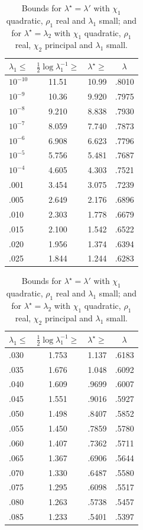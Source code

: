\documentclass[12pt,psamsfonts]{amsart}
\theoremstyle{definition}
\theoremstyle{remark}
\numberwithin{equation}{section}
\begin{document}
\begin{table}
\captionsetup{justification=centering}
\caption{
Bounds for $\lambda^{\star} = \lambda'$ with $\chi_1$ quadratic, $\rho_1$ real and $\lambda_1$ small; \newline and for $\lambda^{\star} = \lambda_2$ with $\chi_1$ quadratic, $\rho_1$ real,  $\chi_2$ principal and $\lambda_1$ small.
}

\begin{tabular}{l|c|c|c} 
$\lambda_1 \leq$ & $\tfrac{1}{2}\log \lambda_1^{-1} \geq$ & $\lambda^{\star} \geq$ & $\lambda$ \\
 \hline 
 $10^{-10}$ &  11.51 &  10.99 &  .8010 \\ 
 $10^{-9}$ &  10.36 &  9.920 &  .7975 \\ 
 $10^{-8}$ &  9.210 &  8.838 &  .7930 \\ 
 $10^{-7}$ &  8.059 &  7.740 &  .7873 \\ 
$10^{-6}$ &  6.908 &  6.623 &  .7796 \\ 
 $10^{-5}$ &  5.756 &  5.481 &  .7687 \\ 
 $10^{-4}$ &  4.605 &  4.303 &  .7521 \\ 
 .001 &  3.454 &  3.075 &  .7239 \\ 
 .005 &  2.649 &  2.176 &  .6896 \\ 
 .010 &  2.303 &  1.778 &  .6679 \\ 
 .015 &  2.100 &  1.542 &  .6522 \\ 
 .020 &  1.956 &  1.374 &  .6394 \\ 
 .025 &  1.844 &  1.244 &  .6283 \\ 
 \end{tabular}
 \qquad
 \begin{tabular}{l|c|c|c} 
$\lambda_1 \leq$ & $\tfrac{1}{2}\log \lambda_1^{-1} \geq$ & $\lambda^{\star} \geq$ & $\lambda$ \\
 \hline 
 .030 &  1.753 &  1.137 &  .6183 \\ 
 .035 &  1.676 &  1.048 &  .6092 \\ 
 .040 &  1.609 &  .9699 &  .6007 \\ 
 .045 &  1.551 &  .9016 &  .5927 \\ 
 .050 &  1.498 &  .8407 &  .5852 \\ 
 .055 &  1.450 &  .7859 &  .5780 \\ 
 .060 &  1.407 &  .7362 &  .5711 \\ 
 .065 &  1.367 &  .6906 &  .5644 \\ 
 .070 &  1.330 &  .6487 &  .5580 \\ 
 .075 &  1.295 &  .6098 &  .5517 \\ 
 .080 &  1.263 &  .5738 &  .5457 \\ 
 .085 &  1.233 &  .5401 &  .5397 \\ 
\end{tabular}

\label{Table-SZ-L1L2small-Chi2Principal}
\label{Table-SZ-L1LpSmall-Quadratic}
\end{table}
\end{document}
